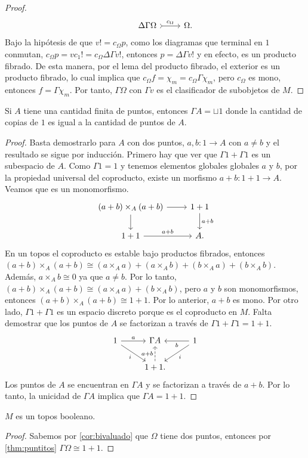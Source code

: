 \begin{proof}
\begin{equation*}
\begin{tikzcd}
      &\Delta\Gamma\Omega\ar[tail]{r}{c_{\Omega}} & \Omega.
    \end{tikzcd}
  \end{equation*}
  Bajo la hipótesis de que $v!=c_{\Omega}p$, como los diagramas que terminal en $1$ conmutan, 
  $c_{\Omega}p=vc_1!=c_{\Omega}\Delta\Gamma v!$, entonces $p=\Delta\Gamma v!$ y en efecto, es un producto fibrado.
  De esta manera, por el lema del producto fibrado, el exterior es un producto fibrado, lo cual implica que
  $c_{\Omega}f=\chi_m=c_{\Omega}\Gamma \chi_m$, pero $c_{\Omega}$ es mono, entonces $f=\Gamma \chi_m$. 
  Por tanto, $\Gamma\Omega$ con $\Gamma v$ es el clasificador de subobjetos de $M$.
\end{proof}

\begin{theorem}[label=thm:puntitos]
  Si $A$ tiene una cantidad finita de puntos, entonces $\Gamma A=\sqcup 1$ donde la cantidad de copias
  de $1$ es igual a la cantidad de puntos de $A$.
\end{theorem}
\begin{proof}
  Basta demostrarlo para $A$ con dos puntos, $a,b\colon 1\to A$ con $a\neq b$ y el resultado se sigue por inducción.
  Primero hay que ver que $\Gamma1 + \Gamma1$ es un subespacio de $A$. Como $\Gamma 1=1$ y tenemos elementos globales 
  globales $a$ y $b$, por la propiedad universal del coproducto, existe un morfismo $a+b\colon 1+1\to A$. Veamos que es un monomorfismo.
  \begin{equation*}
    \begin{tikzcd}
      (a+b)\times_A (a+b)\ar{r}\ar{d} & 1+1\ar{d}{a+b}\\
      1+1\ar{r}{a+b} & A.
    \end{tikzcd}
  \end{equation*}
  En un topos el coproducto es estable bajo productos fibrados, entonces $(a+b)\times_A (a+b)\cong
  (a\times_A a) + (a\times_A b) + (b\times_A a) + (b\times_A b)$. Además, $a\times_A b\cong 0$
  ya que $a\neq b$. Por lo tanto, $(a+b)\times_A (a+b)\cong (a\times_A a) + (b\times_A b)$, pero $a$ y $b$
  son monomorfismos, entonces $(a+b)\times_A (a+b)\cong 1+1$. Por lo anterior, $a+b$ es mono. Por otro lado,
  $\Gamma1+\Gamma1$ es un espacio discreto porque es el coproducto en $M$. Falta demostrar que los puntos
  de $A$ se factorizan a través de $\Gamma1+\Gamma1 = 1+1$.
  \begin{equation*}
    \begin{tikzcd}
      1\ar{r}{a}\ar[swap]{dr}{i} & \Gamma A & 1\ar{l}{b}\ar{dl}{i} \\
      {} & 1+1.\ar[dashed]{u}{a+b} 
    \end{tikzcd}
  \end{equation*}
  Los puntos de $A$ se encuentran en $\Gamma A$ y se factorizan a través de $a+b$. Por lo tanto,
  la unicidad de $\Gamma A$ implica que $\Gamma A = 1+1$.
\end{proof}

\begin{corollary}[label=cor:mbooleano]
  $M$ es un topos booleano.
\end{corollary}
\begin{proof}
  Sabemos por \ref{cor:bivaluado} que $\Omega$ tiene dos puntos, entonces por \ref{thm:puntitos} $\Gamma\Omega \cong 1+1$.
\end{proof}